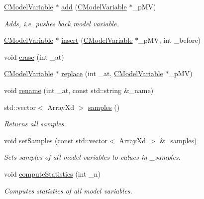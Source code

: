 \begin{DoxyCompactItemize}
\hyperlink{class_go_s_u_m_1_1_c_model_variable}{C\-Model\-Variable} $\ast$ \hyperlink{class_go_s_u_m_1_1_c_model_variables_a5c03df35b287bec6b42dfb1b13a8c7cc}{add} (\hyperlink{class_go_s_u_m_1_1_c_model_variable}{C\-Model\-Variable} $\ast$\-\_\-p\-M\-V)
\begin{DoxyCompactList}\small\item\em Adds, i.\-e. pushes back model variable. \end{DoxyCompactList}\item 
\hyperlink{class_go_s_u_m_1_1_c_model_variable}{C\-Model\-Variable} $\ast$ \hyperlink{class_go_s_u_m_1_1_c_model_variables_aaf419a53e0a053f11801718b7228c578}{insert} (\hyperlink{class_go_s_u_m_1_1_c_model_variable}{C\-Model\-Variable} $\ast$\-\_\-p\-M\-V, int \-\_\-before)
\item 
void \hyperlink{class_go_s_u_m_1_1_c_model_variables_a915503ed71fab8f50e6fa05a13eb9aba}{erase} (int \-\_\-at)
\item 
\hyperlink{class_go_s_u_m_1_1_c_model_variable}{C\-Model\-Variable} $\ast$ \hyperlink{class_go_s_u_m_1_1_c_model_variables_afe392d83fccb9fdf63edbd80e532cf31}{replace} (int \-\_\-at, \hyperlink{class_go_s_u_m_1_1_c_model_variable}{C\-Model\-Variable} $\ast$\-\_\-p\-M\-V)
\item 
void \hyperlink{class_go_s_u_m_1_1_c_model_variables_a2489a0422fc411d13f266bf24639a41c}{rename} (int \-\_\-at, const std\-::string \&\-\_\-name)
\item 
std\-::vector$<$ Array\-Xd $>$ \hyperlink{class_go_s_u_m_1_1_c_model_variables_ab2ae6e3a54d10b6d90f98f402a89f6ee}{samples} ()
\begin{DoxyCompactList}\small\item\em Returns all samples. \end{DoxyCompactList}\item 
void \hyperlink{class_go_s_u_m_1_1_c_model_variables_a7f8df103f73331f3bca77b1baf13da0b}{set\-Samples} (const std\-::vector$<$ Array\-Xd $>$ \&\-\_\-samples)
\begin{DoxyCompactList}\small\item\em Sets samples of all model variables to values in \-\_\-samples. \end{DoxyCompactList}\item 
void \hyperlink{class_go_s_u_m_1_1_c_model_variables_afaf27c06a9addbf93646c67360d3eb48}{compute\-Statistics} (int \-\_\-n)
\begin{DoxyCompactList}\small\item\em Computes statistics of all model variables. \end{DoxyCompactList}\item 

\end{DoxyCompactItemize}
